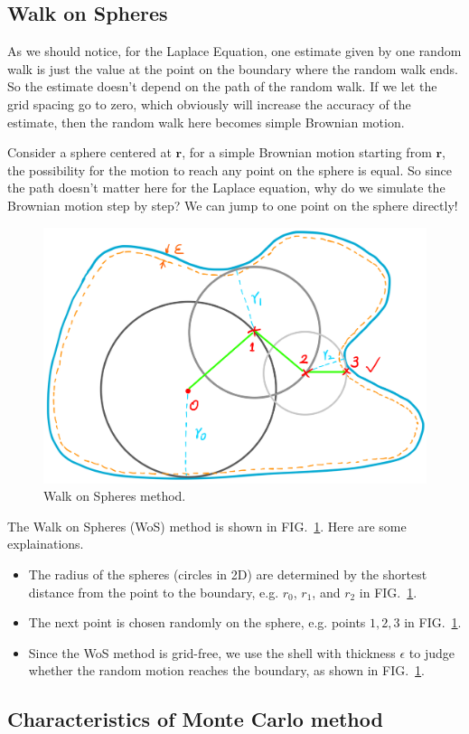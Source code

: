 \documentclass[aps, prl, reprint, groupedaddress]{revtex4-1}
\begin{document}
\subsection{Walk on Spheres}

As we should notice, for the Laplace Equation, one estimate given by one random walk is just the value at the point on the boundary where the random walk ends. So the estimate doesn't depend on the path of the random walk. If we let the grid spacing go to zero, which obviously will increase the accuracy of the estimate, then the random walk here becomes simple Brownian motion.

Consider a sphere centered at $\bm{r}$, for a simple Brownian motion starting from $\bm{r}$, the possibility for the motion to reach any point on the sphere is equal. So since the path doesn't matter here for the Laplace equation, why do we simulate the Brownian motion step by step? We can jump to one point on the sphere directly!

\begin{figure}[htbp]
    \centering
    \includegraphics[width=.46\textwidth]{./figs/wos}
    \caption{\label{fig:wos} Walk on Spheres method.}
\end{figure}

The Walk on Spheres (WoS) method is shown in FIG.~\ref{fig:wos}. Here are some explainations.
\begin{itemize}
    \item The radius of the spheres (circles in 2D) are determined by the shortest distance from the point to the boundary, e.g. $r_0$, $r_1$, and $r_2$ in FIG.~\ref{fig:wos}.
    \item The next point is chosen randomly on the sphere, e.g. points $1, 2, 3$ in FIG.~\ref{fig:wos}.
    \item Since the WoS method is grid-free, we use the shell with thickness $\epsilon$ to judge whether the random motion reaches the boundary, as shown in FIG.~\ref{fig:wos}.
\end{itemize}


\subsection{Characteristics of Monte Carlo method}
\end{document}
